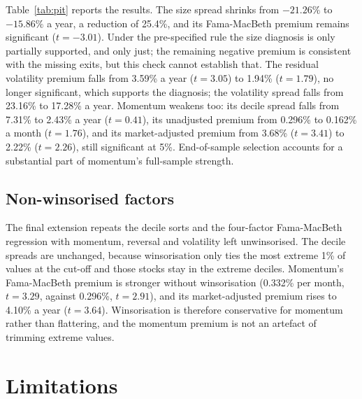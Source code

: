 \documentclass[11pt,a4paper]{article}
\newcommand{\tabfit}[1]{\resizebox{\textwidth}{!}{}}
\begin{document}
\begin{table}[!htbp]
\centering
\caption{Main universe (fixed September 2026 top 200) against the point-in-time (PIT) universe (the same stocks, only while S\&P 500 members at the end of the prior month). Market-adjusted premia are CAPM alphas of the monthly Fama-MacBeth slopes, as in Table~\ref{tab:fmrisk}. Sample: 175 months, February 2012 to August 2026, for the regressions.}
\label{tab:pit}
\small
\tabfit{tables/point_in_time}
\end{table}

Table~\ref{tab:pit} reports the results. The size spread shrinks from $-21.26\%$ to $-15.86\%$ a year, a reduction of 25.4\%, and its Fama-MacBeth premium remains significant ($t = -3.01$). Under the pre-specified rule the size diagnosis is only partially supported, and only just; the remaining negative premium is consistent with the missing exits, but this check cannot establish that. The residual volatility premium falls from 3.59\% a year ($t = 3.05$) to 1.94\% ($t = 1.79$), no longer significant, which supports the diagnosis; the volatility spread falls from 23.16\% to 17.28\% a year. Momentum weakens too: its decile spread falls from 7.31\% to 2.43\% a year ($t = 0.41$), its unadjusted premium from 0.296\% to 0.162\% a month ($t = 1.76$), and its market-adjusted premium from 3.68\% ($t = 3.41$) to 2.22\% ($t = 2.26$), still significant at 5\%. End-of-sample selection accounts for a substantial part of momentum's full-sample strength.

\subsection{Non-winsorised factors}
\label{sec:raw}

The final extension repeats the decile sorts and the four-factor Fama-MacBeth regression with momentum, reversal and volatility left unwinsorised. The decile spreads are unchanged, because winsorisation only ties the most extreme 1\% of values at the cut-off and those stocks stay in the extreme deciles. Momentum's Fama-MacBeth premium is stronger without winsorisation (0.332\% per month, $t = 3.29$, against 0.296\%, $t = 2.91$), and its market-adjusted premium rises to 4.10\% a year ($t = 3.64$). Winsorisation is therefore conservative for momentum rather than flattering, and the momentum premium is not an artefact of trimming extreme values.

\FloatBarrier
\section{Limitations}
\label{sec:limitations}
\end{document}
